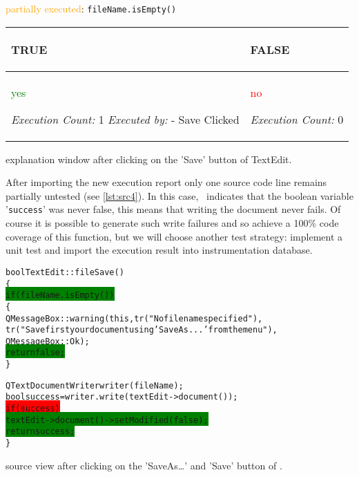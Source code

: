 \begin{listings}[H]
  \scriptsize
  \textcolor{orange}{partially executed}: \texttt{fileName.isEmpty()} \par
\hspace{1cm}
\begin{tabularx}{9cm}{||X||X||} \hline\hline
  \begin{center}\textbf{TRUE}\end{center}          & \begin{center}{\textbf{FALSE}}\end{center}      \\ \hline\hline
  \centerline{\textcolor{green}{yes}} 
  \textit{Execution Count:} 1         \newline
  \textit{Executed by:}               \newline
  \hspace{.4cm}- Save Clicked         &

                                        \centerline{\textcolor{red}{no}} 
                                        \textit{Execution Count:} 0      
                                                                         \\ \hline\hline
\end{tabularx}
\caption{{\CoverageBrowser} explanation window after clicking on the 'Save' button of TextEdit.}
\label{lst:src3}
\end{listings}

After importing the new execution report only one source code line remains
partially untested (see \autoref{lst:src4}). In this case, \CoverageBrowser\ indicates
that the boolean variable '\verb$success$' was never false, this means that writing
the document never fails. Of course it is possible to generate such write failures
and so achieve a 100\% code coverage of this function, but we will choose
another test strategy: implement a unit test and import the execution result
into {\TextEdit} instrumentation database.

\begin{listings}[H]
  \scriptsize
\begin{alltt}
bool TextEdit::fileSave()
\{
\colorbox{green}{  if (fileName.isEmpty())}
  \{
    QMessageBox::warning(this,tr("No file name specified"),
      tr("Save first your document using 'Save As...' from the menu"),
      QMessageBox::Ok );
\colorbox{green}{    return false;}
   \}

  QTextDocumentWriter writer(fileName);
  bool success = writer.write(textEdit->document());
\colorbox{red}{  if (success)}
\colorbox{green}{     textEdit->document()->setModified(false);}
\colorbox{green}{  return success;}
\}
\end{alltt}
\caption{{\CoverageBrowser} source view  after clicking on the 'SaveAs\ldots' and 'Save' button of {\TextEdit}.}
\label{lst:src4}
\end{listings}


